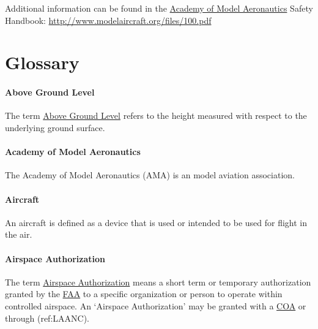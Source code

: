 \documentclass[
]{book}
\begin{document}
Additional information can be found in the \protect\hyperlink{AMA}{Academy of Model Aeronautics} Safety Handbook: \url{http://www.modelaircraft.org/files/100.pdf}

\hypertarget{glossary}{%
\chapter{Glossary}\label{glossary}}

\hypertarget{AGL}{%
\subsubsection*{Above Ground Level}\label{AGL}}

The term \protect\hyperlink{AGL}{Above Ground Level} refers to the height measured with respect to the underlying ground surface.





\hypertarget{AMA}{%
\subsubsection*{Academy of Model Aeronautics}\label{AMA}}

The Academy of Model Aeronautics (AMA) is an model aviation association.



\hypertarget{aircraft}{%
\subsubsection*{Aircraft}\label{aircraft}}

An aircraft is defined as a device that is used or intended to be used for flight in the air.



\hypertarget{AA}{%
\subsubsection*{Airspace Authorization}\label{AA}}

The term \protect\hyperlink{AA}{Airspace Authorization} means a short term or temporary authorization granted by the \protect\hyperlink{FAA}{FAA} to a specific organization or person to operate within controlled airspace. An `Airspace Authorization' may be granted with a \protect\hyperlink{COA}{COA} or through (ref:LAANC).
\end{document}
